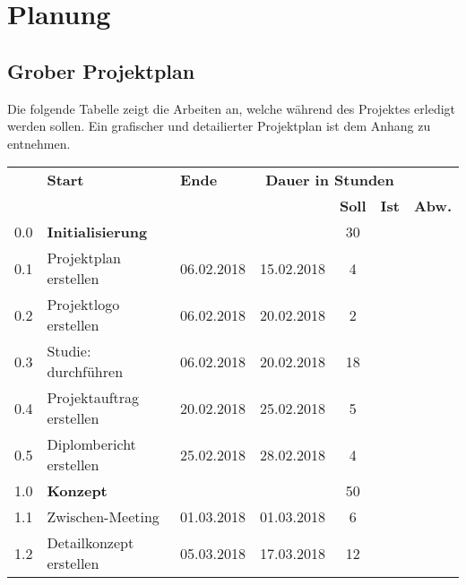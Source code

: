 \newpage
\section{Planung} 
\subsection{Grober Projektplan}
Die folgende Tabelle zeigt die Arbeiten an, welche während des Projektes erledigt werden sollen. Ein grafischer und detailierter Projektplan ist dem Anhang zu entnehmen.

\begin{table}[H]
\centering
\begin{tabular}{p{0.7cm}p{6.8cm}p{2cm}p{2cm}|c|c|c|}

\hline
\rowcolor{heading}\multicolumn{2}{l}{\textbf{Aufgabe}} & \textbf{Start} & \textbf{Ende} & \multicolumn{3}{c|}{\textbf{Dauer in Stunden}} \\
\rowcolor{heading}& & & & \textbf{Soll} & \textbf{Ist} & \textbf{Abw.} \\\hline
\rowcolor{subheading} 0.0 & \textbf{Initialisierung} & & & 30 & & \\\hline
0.1 & Projektplan erstellen & 06.02.2018 & 15.02.2018  & 4 & & \\\hline
0.2 & Projektlogo erstellen & 06.02.2018 & 20.02.2018 & 2 & &\\\hline
0.3 & Studie: durchführen   & 06.02.2018 & 20.02.2018 & 18 & &\\\hline
0.4 & Projektauftrag erstellen & 20.02.2018 & 25.02.2018 & 5 & &\\\hline
0.5 & Diplombericht erstellen  & 25.02.2018 & 28.02.2018 & 4 & &\\\hline
\rowcolor{subheading} 1.0 &\textbf{Konzept} & & & 50 & & \\\hline
1.1 & Zwischen-Meeting & 01.03.2018 & 01.03.2018 & 6 & &\\\hline
1.2 & Detailkonzept erstellen & 05.03.2018 & 17.03.2018 & 12 & & \\\hline

\end{tabular}
\end{table}
